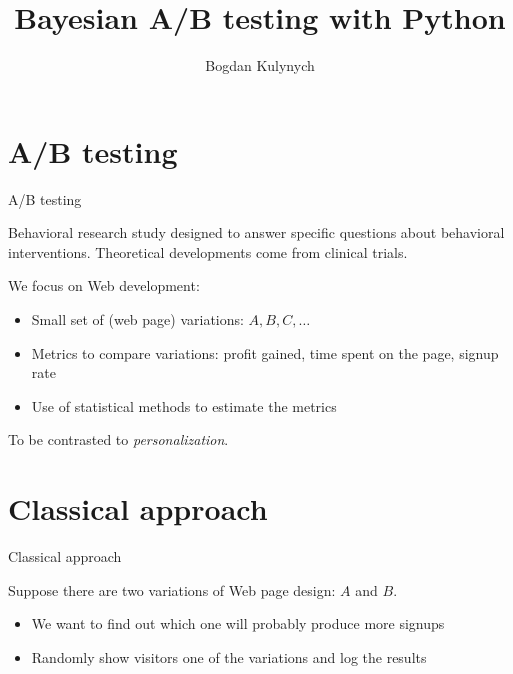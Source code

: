 \documentclass[pdf]{beamer}
\title{\textbf{Bayesian A/B testing with Python}}
\author{Bogdan Kulynych}
\begin{document}


\frame{\titlepage}


\section{A/B testing}


\begin{frame}{A/B testing}
	
	Behavioral research study designed to answer specific questions about behavioral interventions. Theoretical developments come from clinical trials. 
	
	We focus on Web development:
	
	\begin{itemize}
		\item Small set of (web page) variations: $A, B, C, \dots$
		\item Metrics to compare variations: profit gained, time spent on the page,  signup rate
		\item Use of statistical methods to estimate the metrics
	\end{itemize}
		
	To be contrasted to \emph{personalization}.
	
\end{frame}


\section{Classical approach} 


\begin{frame}{Classical approach}

Suppose there are two variations of Web page design: $A$ and $B$.

\vspace{.5cm}


\vspace{.5cm}

\begin{itemize}
	\item We want to find out which one will probably produce more signups
	\item Randomly show visitors one of the variations and log the results
\end{itemize}

\end{frame}
\end{document}
